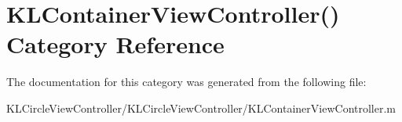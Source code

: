 \hypertarget{category_k_l_container_view_controller_07_08}{\section{K\-L\-Container\-View\-Controller() Category Reference}
\label{category_k_l_container_view_controller_07_08}
}


The documentation for this category was generated from the following file\-:\begin{DoxyCompactItemize}
\item 
K\-L\-Circle\-View\-Controller/\-K\-L\-Circle\-View\-Controller/K\-L\-Container\-View\-Controller.\-m\end{DoxyCompactItemize}

